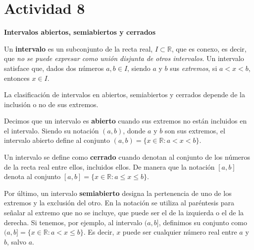 \section*{Actividad 8}
\textbf{Intervalos abiertos, semiabiertos y cerrados}

Un \textbf{intervalo} es un subconjunto de la recta real, $I \subset \mathbb{R}$, que es conexo, es decir, que \textit{no se puede expresar como unión disjunta de otros intervalos}. Un intervalo satisface que, dados dos números $a, b \in I$, siendo $a$ y $b$ sus \textit{extremos}, si $a < x < b$, entonces $x \in I$.

La clasificación de intervalos en abiertos, semiabiertos y cerrados depende de la inclusión o no de sus extremos. 

Decimos que un intervalo es \textbf{abierto} cuando sus extremos no están incluidos en el intervalo. Siendo su notación $(a, b)$, donde $a$ y $b$ son sus extremos, el intervalo abierto define al conjunto $(a, b)=\{x \in \mathbb{R} : a < x < b\}$.

Un intervalo se define como \textbf{cerrado} cuando denotan al conjunto de los números de la recta real entre ellos, incluidos ellos. De manera que la notación $[a, b]$ denota al conjunto $[a, b] = \{x \in \mathbb{R} : a \leq x \leq b\}$.

Por último, un intervalo \textbf{semiabierto} designa la pertenencia de uno de los extremos y la exclusión del otro. En la notación se utiliza al paréntesis para señalar al extremo que no se incluye, que puede ser el de la izquierda o el de la derecha. Si tenemos, por ejemplo, al intervalo $(a, b]$, definimos su conjunto como $(a, b] = \{x \in \mathbb{R} : a < x \leq b\}$. Es decir, $x$ puede ser cualquier número real entre $a$ y $b$, salvo $a$.
